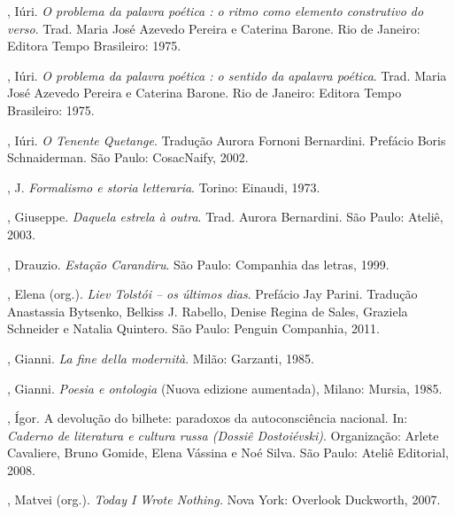 \begin{Parskip}
, Iúri. \emph{O problema da palavra poética : o ritmo como elemento
construtivo do verso}. Trad. Maria José Azevedo Pereira e Caterina
Barone. Rio de Janeiro: Editora Tempo Brasileiro: 1975.

, Iúri. \emph{O problema da palavra poética : o sentido da apalavra
poética}. Trad. Maria José Azevedo Pereira e Caterina Barone. Rio de
Janeiro: Editora Tempo Brasileiro: 1975.

, Iúri. \emph{O Tenente Quetange}. Tradução Aurora Fornoni Bernardini. Prefácio Boris Schnaiderman. São Paulo: CosacNaify, 2002.

, J. \emph{Formalismo e storia letteraria}. Torino: Einaudi, 1973.

, Giuseppe. \emph{Daquela estrela à outra}. Trad. Aurora Bernardini. São Paulo: Ateliê, 2003.

, Drauzio. \emph{Estação Carandiru}. São Paulo: Companhia das letras, 1999.

, Elena (org.). \emph{Liev Tolstói -- os últimos dias}. Prefácio Jay Parini. Tradução
Anastassia Bytsenko, Belkiss J. Rabello, Denise Regina de Sales, Graziela Schneider e Natalia Quintero. São Paulo:
Penguin Companhia, 2011.

, Gianni. \emph{La fine della modernità}. Milão: Garzanti, 1985.

, Gianni. \emph{Poesia e ontologia} (Nuova edizione aumentada),
Milano: Mursia, 1985.

, Ígor. A devolução do bilhete: paradoxos da
autoconsciência nacional. In: \emph{Caderno de literatura e cultura russa (Dossiê Dostoiévski)}. Organização: Arlete Cavaliere, Bruno Gomide, Elena Vássina e Noé Silva. São Paulo: Ateliê Editorial, 2008.

, Matvei (org.). \emph{Today I Wrote Nothing.} Nova York:
Overlook Duckworth, 2007.
\end{Parskip}

\afterpage{\blankpage}